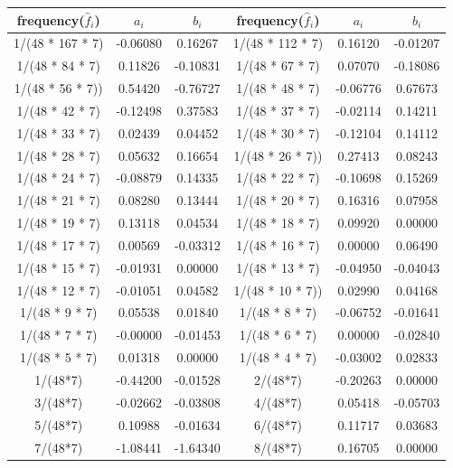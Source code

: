 \documentclass[12pt,msc]{uom_eee_dissertation_casson}
\begin{document}
\begin{table}
\centering
\begin{tabular}{| c | c | c | c | c | c |}
		\hline
		frequency($\hat{f}_{i}$) & $a_{i}$ & $b_{i}$ & frequency($\hat{f}_{i}$) & $a_{i}$ & $b_{i}$\\ \hline
1/(48 * 167 * 7) & -0.06080& 0.16267& 1/(48 * 112 * 7) &  0.16120& -0.01207 \\ \hline
1/(48 * 84 * 7)  &  0.11826&-0.10831&1/(48 * 67 * 7)   &  0.07070& -0.18086\\ \hline
1/(48 * 56 * 7)) &  0.54420&-0.76727&1/(48 * 48 * 7)   & -0.06776&  0.67673 \\ \hline
1/(48 * 42 * 7)  & -0.12498& 0.37583&1/(48 * 37 * 7)   & -0.02114&  0.14211 \\ \hline
1/(48 * 33 * 7)  &  0.02439& 0.04452&1/(48 * 30 * 7)   & -0.12104&  0.14112 \\ \hline
1/(48 * 28 * 7)  &  0.05632& 0.16654&1/(48 * 26 * 7))  &  0.27413&  0.08243\\ \hline
1/(48 * 24 * 7)  & -0.08879& 0.14335&1/(48 * 22 * 7)   & -0.10698&  0.15269 \\ \hline
1/(48 * 21 * 7)  &  0.08280& 0.13444&1/(48 * 20 * 7)   &  0.16316&  0.07958 \\ \hline
1/(48 * 19 * 7)  &  0.13118& 0.04534&1/(48 * 18 * 7)   &  0.09920& 0.00000 \\ \hline
1/(48 * 17 * 7)  &  0.00569&-0.03312&1/(48 * 16 * 7)   &  0.00000&  0.06490 \\ \hline
1/(48 * 15 * 7)  & -0.01931& 0.00000&1/(48 * 13 * 7)   & -0.04950& -0.04043\\ \hline
1/(48 * 12 * 7)  & -0.01051& 0.04582&1/(48 * 10 * 7))  &  0.02990&  0.04168\\ \hline
1/(48 * 9 * 7)   &  0.05538& 0.01840&1/(48 * 8 * 7)    & -0.06752& -0.01641\\ \hline
1/(48 * 7 * 7)   & -0.00000&-0.01453&1/(48 * 6 * 7)    &  0.00000& -0.02840\\ \hline
1/(48 * 5 * 7)   &  0.01318& 0.00000&1/(48 * 4 * 7)    & -0.03002&  0.02833\\ \hline
1/(48*7)         & -0.44200&-0.01528&2/(48*7)          & -0.20263&  0.00000\\ \hline
3/(48*7)         & -0.02662&-0.03808&4/(48*7)          &  0.05418& -0.05703\\ \hline
5/(48*7)         &  0.10988&-0.01634&6/(48*7)          &  0.11717&  0.03683\\ \hline
7/(48*7)         & -1.08441&-1.64340&8/(48*7)          &  0.16705&  0.00000  \\ \hline

\end{tabular}
\end{table}
\end{document}
